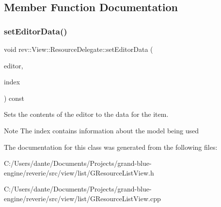 \subsection{Member Function Documentation}
\mbox{\label{classrev_1_1_view_1_1_resource_delegate_a19d4bd6e52584f79bb705957401a382b}} 
\subsubsection{\texorpdfstring{setEditorData()}{setEditorData()}}
{\footnotesize\ttfamily void rev\+::\+View\+::\+Resource\+Delegate\+::set\+Editor\+Data (\begin{DoxyParamCaption}\item[{Q\+Widget $\ast$}]{editor,  }\item[{const Q\+Model\+Index \&}]{index }\end{DoxyParamCaption}) const\hspace{0.3cm}{\ttfamily [override]}}



Sets the contents of the editor to the data for the item. 

\begin{DoxyNote}{Note}
The index contains information about the model being used 
\end{DoxyNote}


The documentation for this class was generated from the following files\+:\begin{DoxyCompactItemize}
\item 
C\+:/\+Users/dante/\+Documents/\+Projects/grand-\/blue-\/engine/reverie/src/view/list/G\+Resource\+List\+View.\+h\item 
C\+:/\+Users/dante/\+Documents/\+Projects/grand-\/blue-\/engine/reverie/src/view/list/G\+Resource\+List\+View.\+cpp\end{DoxyCompactItemize}

